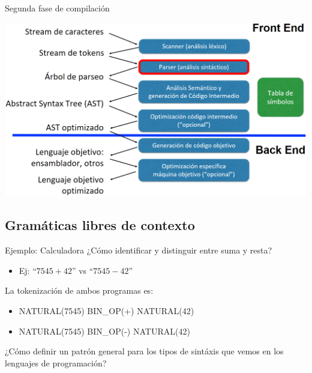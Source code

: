 \documentclass[handout]{beamer} %
\begin{document}
\begin{frame}{Segunda fase de compilación}
    \begin{center}
    \includegraphics[width=\textwidth]{./image/cap2/compilador-fase2}
    \end{center}
\end{frame}

\subsection{Gramáticas libres de contexto}

\begin{frame}{Ejemplo: Calculadora}
    ¿Cómo identificar y distinguir entre suma y resta?
    \begin{itemize}
        \item Ej: ``$7545 + 42$'' vs ``$7545 - 42$''
    \end{itemize}
    \pause
    
    La tokenización de ambos programas es:
    \begin{itemize}
        \item NATURAL(7545) BIN\_OP(+) NATURAL(42)
        \item NATURAL(7545) BIN\_OP(-) NATURAL(42)
    \end{itemize}
    \pause

    ¿Cómo definir un patrón general para los tipos de sintáxis que vemos en los lenguajes de programación?
\end{frame}
\end{document}
